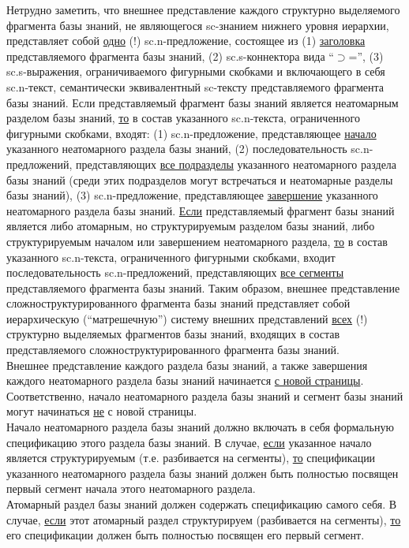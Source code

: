 \begin{SCn}
{Нетрудно заметить, что внешнее представление каждого структурно выделяемого фрагмента базы знаний, не являющегося sc-знанием нижнего уровня иерархии, представляет собой \uline{одно} (!) sc.n-предложение, состоящее из (1) \uline{заголовка} представляемого фрагмента базы знаний, (2) sc.s-коннектора вида ``$\supset$='', (3) sc.s-выражения, ограничиваемого фигурными скобками и включающего в себя sc.n-текст, семантически эквивалентный sc-тексту представляемого фрагмента базы знаний. Если представляемый фрагмент базы знаний является неатомарным разделом базы знаний, \uline{то} в состав указанного sc.n-текста, ограниченного фигурными скобками, входят: (1) sc.n-предложение, представляющее \uline{начало} указанного неатомарного раздела базы знаний, (2) последовательность sc.n-предложений, представляющих \uline{все подразделы} указанного неатомарного раздела базы знаний (среди этих подразделов могут встречаться и неатомарные разделы базы знаний), (3) sc.n-предложение, представляющее \uline{завершение} указанного неатомарного раздела базы знаний. \uline{Если} представляемый фрагмент базы знаний является либо атомарным, но структурируемым разделом базы знаний, либо структурируемым началом или завершением неатомарного раздела, \uline{то} в состав указанного sc.n-текста, ограниченного фигурными скобками, входит последовательность sc.n-предложений, представляющих \uline{все сегменты} представляемого фрагмента базы знаний. Таким образом, внешнее представление сложноструктурированного фрагмента базы знаний представляет собой иерархическую (``матрешечную'') систему внешних представлений \uline{всех} (!) структурно выделяемых фрагментов базы знаний, входящих в состав представляемого сложноструктурированного фрагмента базы знаний.\\
Внешнее представление каждого раздела базы знаний, а также завершения каждого неатомарного раздела базы знаний начинается \uline{с новой страницы}. Соответственно, начало неатомарного раздела базы знаний и сегмент базы знаний могут начинаться \uline{не} с новой страницы.\\
Начало неатомарного раздела базы знаний должно включать в себя формальную спецификацию этого раздела базы знаний. В случае, \uline{если} указанное начало является структурируемым (т.е. разбивается на сегменты), \uline{то} спецификации указанного неатомарного раздела базы знаний должен быть полностью посвящен первый сегмент начала этого неатомарного раздела.\\
Атомарный раздел базы знаний должен содержать спецификацию самого себя. В случае, \uline{если} этот атомарный раздел структурируем (разбивается на сегменты), \uline{то} его спецификации должен быть полностью посвящен его первый сегмент.\\
}
\end{SCn}
